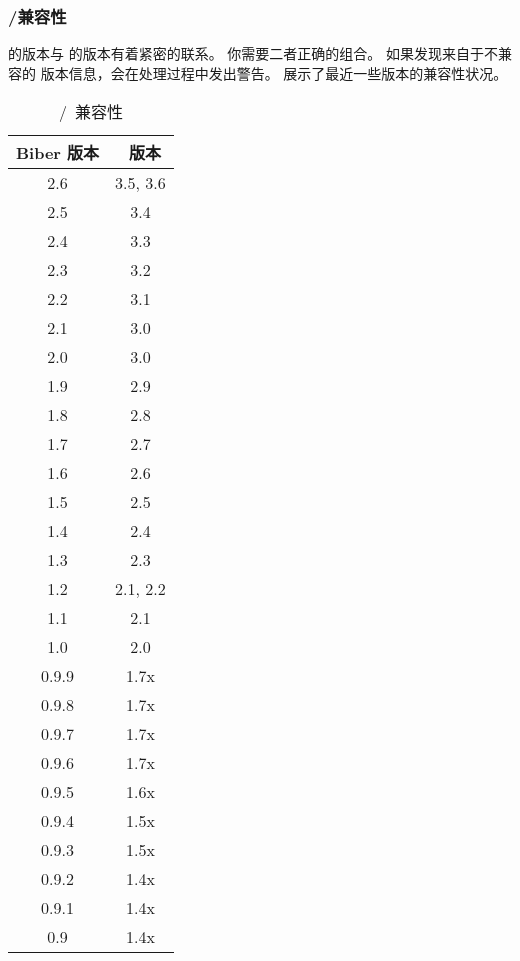 \subsubsection{\biber/\biblatex 兼容性}
\label{int:pre:bibercompat}


\biber 的版本与 \biblatex 的版本有着紧密的联系。
你需要二者正确的组合。
如果发现来自于不兼容的 \biblatex 版本信息，\biber 会在处理过程中发出警告。
 展示了最近一些版本的兼容性状况。

\begin{table}
	\tablesetup\centering
	\begin{tabular}{cc}
		\toprule
		\sffamily\bfseries\spotcolor Biber 版本
		& \sffamily\bfseries\spotcolor \biblatex\ 版本\\
		\midrule
		2.6 & 3.5, 3.6\\
		2.5 & 3.4\\
		2.4 & 3.3\\
		2.3 & 3.2\\
		2.2 & 3.1\\
		2.1 & 3.0\\
		2.0 & 3.0\\
		1.9 & 2.9\\
		1.8 & 2.8\\
		1.7 & 2.7\\
		1.6 & 2.6\\
		1.5 & 2.5\\
		1.4 & 2.4\\
		1.3 & 2.3\\
		1.2 & 2.1, 2.2\\
		1.1 & 2.1\\
		1.0 & 2.0\\
		0.9.9 & 1.7x\\
		0.9.8 & 1.7x\\
		0.9.7 & 1.7x\\
		0.9.6 & 1.7x\\
		0.9.5 & 1.6x\\
		0.9.4 & 1.5x\\
		0.9.3 & 1.5x\\
		0.9.2 & 1.4x\\
		0.9.1 & 1.4x\\
		0.9 & 1.4x\\
		\bottomrule
	\end{tabular}
	\caption{\biber/\biblatex\ 兼容性}
	\label{tab:int:pre:bibercompat}
\end{table}
